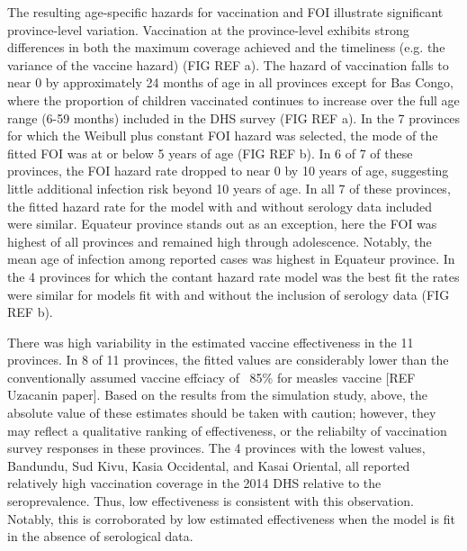 \documentclass[nofootinbib,aps,pre,twocolumn,superscriptaddress,showkeys,showpacs]{revtex4-1}
\begin{document}
The resulting age-specific hazards for vaccination and FOI illustrate significant province-level variation.  Vaccination at the province-level exhibits strong differences in both the maximum coverage achieved and the timeliness (e.g. the variance of the vaccine hazard) (FIG REF a).  The hazard of vaccination falls to near 0 by approximately 24 months of age in all provinces except for Bas Congo, where the proportion of children vaccinated continues to increase over the full age range (6-59 months) included in the DHS survey (FIG REF a). In the 7 provinces for which the Weibull plus constant FOI hazard was selected, the mode of the fitted FOI was at or below 5 years of age (FIG REF b).  In 6 of 7 of these provinces, the FOI hazard rate dropped to near 0 by 10 years of age, suggesting little additional infection risk beyond 10 years of age.  In all 7 of these provinces, the fitted hazard rate for the model with and without serology data included were similar.  Equateur province stands out as an exception, here the FOI was highest of all provinces and remained high through adolescence. Notably, the mean age of infection among reported cases was highest in Equateur province. In the 4 provinces for which the contant hazard rate model was the best fit the rates were similar for models fit with and without the inclusion of serology data (FIG REF b).

There was high variability in the estimated vaccine effectiveness in the 11 provinces.  In 8 of 11 provinces, the fitted values are considerably lower than the conventionally assumed vaccine effciacy of ~85\% for measles vaccine [REF Uzacanin paper]. Based on the results from the simulation study, above, the absolute value of these estimates should be taken with caution; however, they may reflect a qualitative ranking of effectiveness, or the reliabilty of vaccination survey responses in these provinces.  The 4 provinces with the lowest values, Bandundu, Sud Kivu, Kasia Occidental, and Kasai Oriental, all reported relatively high vaccination coverage in the 2014 DHS relative to the seroprevalence.  Thus, low effectiveness is consistent with this observation.  Notably, this is corroborated by low estimated effectiveness when the model is fit in the absence of serological data.
\end{document}
